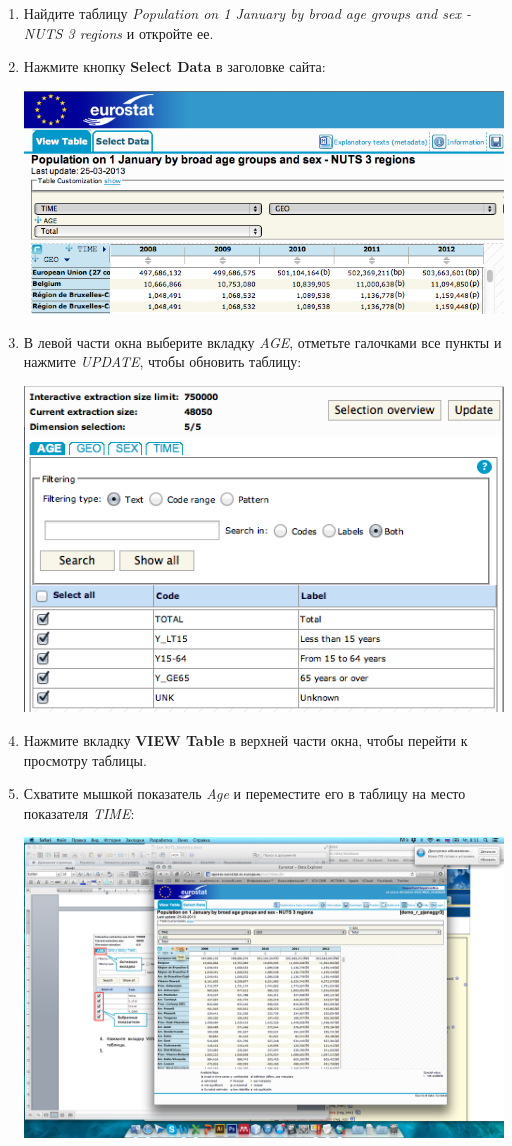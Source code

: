 \documentclass[12pt,]{book}
\begin{document}
\begin{enumerate}
\def\labelenumi{\arabic{enumi}.}
\item
  Найдите таблицу \emph{Population on 1 January by broad age groups and sex - NUTS 3 regions} и откройте ее.
\item
  Нажмите кнопку \textbf{Select Data} в заголовке сайта:

  \includegraphics{images/Ex08/image11.png}
\item
  В левой части окна выберите вкладку \emph{AGE}, отметьте галочками все пункты и нажмите \emph{UPDATE}, чтобы обновить таблицу:

  \includegraphics{images/Ex08/image12.png}
\item
  Нажмите вкладку \textbf{VIEW Table} в верхней части окна, чтобы перейти к просмотру таблицы.
\item
  Схватите мышкой показатель \emph{Age} и переместите его в таблицу на место показателя \emph{TIME}:

  \includegraphics{images/Ex08/image13.png}


\end{enumerate}
\end{document}
